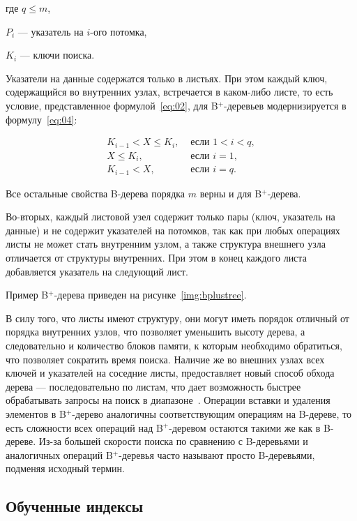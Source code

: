 где $q \leqslant m$,

$P_i$ --- указатель на $i$-ого потомка,

$K_i$ --- ключи поиска.

Указатели на данные содержатся только в листьях. При этом каждый ключ,
содержащийся во внутренних узлах, встречается в каком-либо листе, то есть
условие, представленное формулой~\eqref{eq:02}, для B$^+$-деревьев
модернизируется в формулу~\eqref{eq:04}:

\begin{equation}\label{eq:04}
    \begin{aligned}
        K_{i-1} < X \leqslant K_i, & \text{ если } 1 < i < q,\\
        X \leqslant K_i, & \text{ если } i = 1,\\
        K_{i-1} < X, & \text{ если } i = q.
    \end{aligned}
\end{equation}

Все остальные свойства B-дерева порядка $m$ верны и для B$^+$-дерева.

Во-вторых, каждый листовой узел содержит только пары (ключ, указатель на данные)
и не содержит указателей на потомков, так как при любых операциях листы не может
стать внутренним узлом, а также структура внешнего узла отличается от структуры
внутренних. При этом в конец каждого листа добавляется указатель на следующий
лист.

Пример B$^+$-дерева приведен на рисунке~\ref{img:bplustree}.


В силу того, что листы имеют структуру, они могут иметь порядок отличный от
порядка внутренних узлов, что позволяет уменьшить высоту дерева, а следовательно
и количество блоков памяти, к которым необходимо обратиться, что позволяет
сократить время поиска. Наличие же во внешних узлах всех ключей и указателей на
соседние листы, предоставляет новый способ обхода дерева --- последовательно по
листам, что дает возможность быстрее обрабатывать запросы на поиск в
диапазоне~\cite{baw}.  Операции вставки и удаления элементов в B$^+$-дерево
аналогичны соответствующим операциям на B-дереве, то есть сложности всех
операций над B$^+$-деревом остаются такими же как в B-дереве. Из-за большей
скорости поиска по сравнению с B-деревьями и аналогичных операций B$^+$-деревья
часто называют просто B-деревьями, подменяя исходный термин.

\subsection{Обученные индексы}

